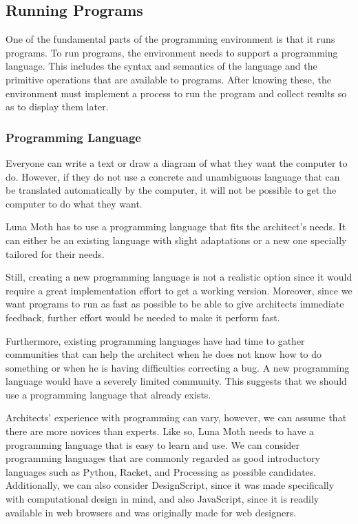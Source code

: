 \subsection{Running Programs}
\label{sec:run:progs}
One of the fundamental parts of the programming environment is that it runs programs.
To run programs, the environment needs to support a programming language.
This includes the syntax and semantics of the language and the primitive operations that are available to programs.
After knowing these, the environment must implement a process to run the program and collect results so as to display them later.


\subsubsection{Programming Language}
Everyone can write a text or draw a diagram of what they want the computer to do.
However, if they do not use a concrete and unambiguous language that can be translated automatically by the computer, it will not be possible to get the computer to do what they want.

Luna Moth has to use a programming language that fits the architect's needs.
It can either be an existing language with slight adaptations or a new one specially tailored for their needs.

Still, creating a new programming language is not a realistic option since it would require a great implementation effort to get a working version.
Moreover, since we want programs to run as fast as possible to be able to give architects immediate feedback, further effort would be needed to make it perform fast.

Furthermore, existing programming languages have had time to gather communities that can help the architect when he does not know how to do something or when he is having difficulties correcting a bug.
A new programming language would have a severely limited community.
This suggests that we should use a programming language that already exists.

Architects' experience with programming can vary, however, we can assume that there are more novices than experts.
Like so, Luna Moth needs to have a programming language that is easy to learn and use.
We can consider programming languages that are commonly regarded as good introductory languages such as Python, Racket, and Processing as possible candidates.
Additionally, we can also consider DesignScript, since it was made specifically with computational design in mind\cite{aish2013designscript}, and also JavaScript, since it is readily available in web browsers and was originally made for web designers.

